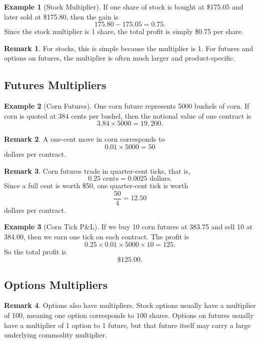 \documentclass[11pt]{article}
\theoremstyle{definition}
\newtheorem{example}{Example}[section]
\newtheorem{remark}{Remark}[section]
\begin{document}
\begin{example}[Stock Multiplier]
If one share of stock is bought at \$175.05 and later sold at \$175.80, then the gain is
\[
175.80 - 175.05 = 0.75.
\]
Since the stock multiplier is 1 share, the total profit is simply \$0.75 per share.
\end{example}

\begin{remark}
For stocks, this is simple because the multiplier is 1. For futures and options on futures, the multiplier is often much larger and product-specific.
\end{remark}

\subsection{Futures Multipliers}

\begin{example}[Corn Futures]
One corn future represents 5000 bushels of corn. If corn is quoted at 384 cents per bushel, then the notional value of one contract is
\[
3.84 \times 5000 = 19{,}200.
\]
\end{example}

\begin{remark}
A one-cent move in corn corresponds to
\[
0.01 \times 5000 = 50
\]
dollars per contract.
\end{remark}

\begin{remark}
Corn futures trade in quarter-cent ticks, that is,
\[
0.25 \text{ cents} = 0.0025 \text{ dollars}.
\]
Since a full cent is worth \$50, one quarter-cent tick is worth
\[
\frac{50}{4} = 12.50
\]
dollars per contract.
\end{remark}

\begin{example}[Corn Tick P\&L]
If we buy 10 corn futures at 383.75 and sell 10 at 384.00, then we earn one tick on each contract. The profit is
\[
0.25 \times 0.01 \times 5000 \times 10 = 125.
\]
So the total profit is
\[
\boxed{\$125.00.}
\]
\end{example}

\subsection{Options Multipliers}

\begin{remark}
Options also have multipliers. Stock options usually have a multiplier of 100, meaning one option corresponds to 100 shares. Options on futures usually have a multiplier of 1 option to 1 future, but that future itself may carry a large underlying commodity multiplier.
\end{remark}
\end{document}
